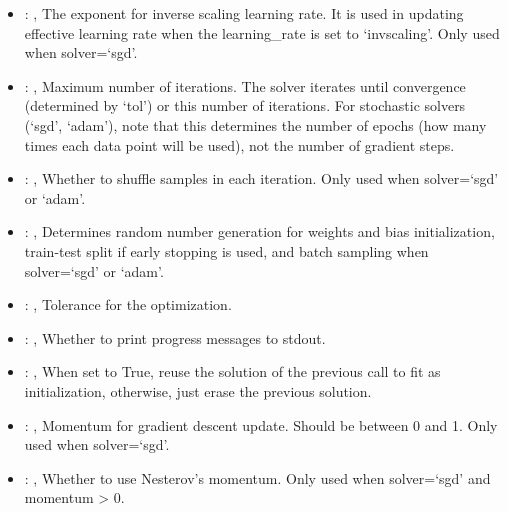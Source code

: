 \begin{itemize}
    \item {}: , 
      The exponent for inverse scaling learning rate. It is used in updating effective
      learning rate when the learning\_rate is set to `invscaling'. Only used when solver=`sgd'.

    \item {}: , 
      Maximum number of iterations. The solver iterates until convergence
      (determined by `tol') or this number of iterations. For stochastic solvers (`sgd', `adam'),
      note that this determines the number of epochs (how many times each data point will be used),
      not the number of gradient steps.

    \item {}: , 
      Whether to shuffle samples in each iteration. Only used when solver=`sgd' or `adam'.

    \item {}: , 
      Determines random number generation for weights and bias initialization,
      train-test split if early stopping is used, and batch sampling when solver=`sgd' or `adam'.

    \item {}: , 
      Tolerance for the optimization.

    \item {}: , 
      Whether to print progress messages to stdout.

    \item {}: , 
      When set to True, reuse the solution of the previous call to fit as initialization, otherwise,
      just erase the previous solution.

    \item {}: , 
      Momentum for gradient descent update. Should be between 0 and 1. Only used when solver=`sgd'.

    \item {}: , 
      Whether to use Nesterov's momentum. Only used when solver=`sgd' and momentum > 0.


\end{itemize}
